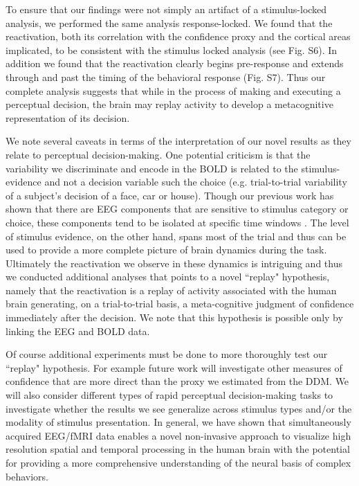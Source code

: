 To ensure that our findings were not simply an artifact of a stimulus-locked analysis, we performed the same analysis response-locked.  We found that the reactivation, both its correlation with the confidence proxy and the cortical areas implicated, to be consistent with the stimulus locked analysis (see Fig. S6). In addition we found that the reactivation clearly begins pre-response and extends through and past the timing of the behavioral response (Fig. S7). Thus our complete analysis suggests that while in the process of making and executing a perceptual decision, the brain may replay activity to develop a metacognitive representation of its decision.

We note several caveats in terms of the interpretation of our novel results as they relate to perceptual decision-making.  One potential criticism is that the variability we discriminate and encode in the BOLD is related to the stimulus-evidence and not a decision variable such the choice (e.g. trial-to-trial variability of a subject’s decision of a face, car or house). Though our previous work has shown that there are EEG components that are sensitive to stimulus category or choice, these components tend to be isolated at specific time windows \cite{Philiastides2006,Philiastides2006d}. The level of stimulus evidence, on the other hand, spans most of the trial and thus can be used to provide a more complete picture of brain dynamics during the task. Ultimately the reactivation we observe in these dynamics is intriguing and thus we conducted additional analyses that points to a novel ``replay" hypothesis, namely that the reactivation is a replay of activity associated with the human brain generating, on a trial-to-trial basis, a meta-cognitive judgment of confidence immediately after the decision.  We note that this hypothesis is possible only by linking the EEG and BOLD data.  

Of course additional experiments must be done to more thoroughly test our ``replay" hypothesis.  For example future work will investigate other measures of confidence that are more direct than the proxy we estimated from the DDM.  We will also consider different types of rapid perceptual decision-making tasks to investigate whether the results we see generalize across stimulus types and/or the modality of stimulus presentation. In general, we have shown that simultaneously acquired EEG/fMRI data enables a novel non-invasive approach to visualize high resolution spatial and temporal processing in the human brain with the potential for providing a more comprehensive understanding of the neural basis of complex behaviors.
